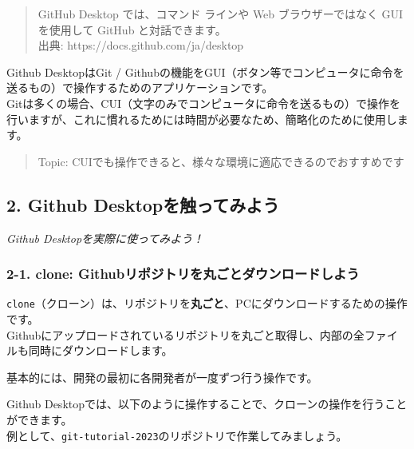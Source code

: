\begin{quote}
GitHub Desktop では、コマンド ラインや Web ブラウザーではなく GUI
を使用して GitHub と対話できます。\\
出典: https://docs.github.com/ja/desktop
\end{quote}

Github DesktopはGit /
Githubの機能をGUI（ボタン等でコンピュータに命令を送るもの）で操作するためのアプリケーションです。\\
Gitは多くの場合、CUI（文字のみでコンピュータに命令を送るもの）で操作を行いますが、これに慣れるためには時間が必要なため、簡略化のために使用します。

\begin{quote}
Topic: CUIでも操作できると、様々な環境に適応できるのでおすすめです
\end{quote}

\subsection{2. Github
Desktopを触ってみよう}\label{github-desktopux3092ux89e6ux3063ux3066ux307fux3088ux3046}

\emph{Github Desktopを実際に使ってみよう！}

\subsubsection{2-1. clone:
Githubリポジトリを丸ごとダウンロードしよう}\label{clone-githubux30eaux30ddux30b8ux30c8ux30eaux3092ux4e38ux3054ux3068ux30c0ux30a6ux30f3ux30edux30fcux30c9ux3057ux3088ux3046}

\begin{Shaded}
\begin{Highlighting}[]

\end{Highlighting}
\end{Shaded}

\texttt{clone}（クローン）は、リポジトリを\textbf{丸ごと}、PCにダウンロードするための操作です。\\
Githubにアップロードされているリポジトリを丸ごと取得し、内部の全ファイルも同時にダウンロードします。

基本的には、開発の最初に各開発者が一度ずつ行う操作です。

Github
Desktopでは、以下のように操作することで、クローンの操作を行うことができます。\\
例として、\texttt{git-tutorial-2023}のリポジトリで作業してみましょう。

